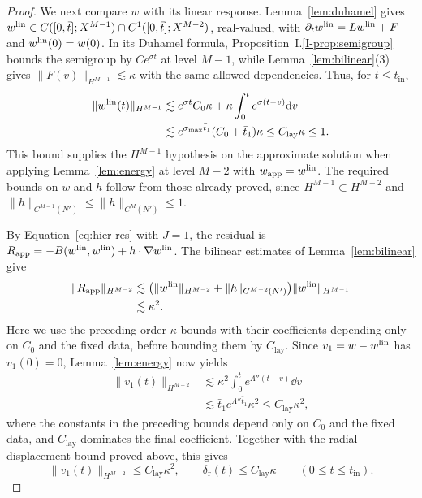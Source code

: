 \begin{proof}
We next compare $w$ with its linear response. Lemma~\ref{lem:duhamel} gives
$w^{\mathrm{lin}}\in C([0,\bar t];X^{M-1})\cap C^1([0,\bar t];X^{M-2})$, real-valued,
with $\partial_tw^{\mathrm{lin}}=Lw^{\mathrm{lin}}+F$ and $w^{\mathrm{lin}}(0)=w(0)$.
In its Duhamel formula, Proposition~I.\ref{I-prop:semigroup} bounds the
semigroup by $Ce^{\sigma t}$ at level $M-1$, while
Lemma~\ref{lem:bilinear}\textup{(3)} gives
$\|F(v)\|_{H^{M-1}}\lesssim\kappa$ with the same allowed dependencies.
Thus, for $t\le t_{\mathrm{in}}$,
\[
\begin{aligned}
\|w^{\mathrm{lin}}(t)\|_{H^{M-1}}
&\lesssim e^{\sigma t}C_0\kappa
 +\kappa\int_0^te^{\sigma(t-v)}\dd v\\
&\lesssim e^{\sigma_{\max}\bar t_1}(C_0+\bar t_1)\kappa
 \le C_{\mathrm{lay}}\kappa\le1.
\end{aligned}
\]
This bound supplies the $H^{M-1}$ hypothesis on the approximate solution
when applying Lemma~\ref{lem:energy} at level $M-2$ with
$w_{\mathrm{app}}=w^{\mathrm{lin}}$. The required bounds on $w$ and $h$ follow from
those already proved, since $H^{M-1}\subset H^{M-2}$ and
$\|h\|_{C^{M-1}(N')}\le\|h\|_{C^M(N')}\le1$.

By Equation~\eqref{eq:hier-res} with $J=1$, the residual is
$R_{\mathrm{app}}=-B(w^{\mathrm{lin}},w^{\mathrm{lin}})+h\cdot\nabla w^{\mathrm{lin}}$.
The bilinear estimates of Lemma~\ref{lem:bilinear} give
\[
\begin{aligned}
\|R_{\mathrm{app}}\|_{H^{M-2}}
&\lesssim
 \big(\|w^{\mathrm{lin}}\|_{H^{M-2}}+\|h\|_{C^{M-2}(N')}\big)
 \|w^{\mathrm{lin}}\|_{H^{M-1}}\\
&\lesssim\kappa^2.
\end{aligned}
\]
Here we use the preceding order-$\kappa$ bounds with their coefficients
depending only on $C_0$ and the fixed data, before bounding them by $C_{\mathrm{lay}}$.
Since $v_1=w-w^{\mathrm{lin}}$ has $v_1(0)=0$, Lemma~\ref{lem:energy} now yields
\[
\begin{aligned}
\|v_1(t)\|_{H^{M-2}}
&\lesssim\kappa^2\int_0^te^{\Lambda''(t-v)}\dd v\\
&\lesssim\bar t_1e^{\Lambda''\bar t_1}\kappa^2
 \le C_{\mathrm{lay}}\kappa^2,
\end{aligned}
\]
where the constants in the preceding bounds depend only on $C_0$ and the
fixed data, and $C_{\mathrm{lay}}$ dominates the final coefficient.
Together with the radial-displacement bound proved above, this gives
\begin{equation}
\label{eq:A-layer}
\|v_1(t)\|_{H^{M-2}}\le C_{\mathrm{lay}}\kappa^2,\qquad \delta_{\mathrm r}(t)\le C_{\mathrm{lay}}\kappa\qquad(0\le t\le t_{\mathrm{in}}).
\end{equation}


\end{proof}
